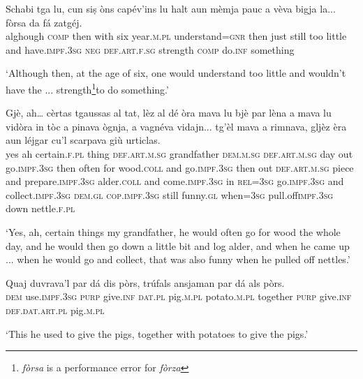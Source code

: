 \begin{linenumbers}
\gll Schabi tga lu, cun siṣ òns capév’ins lu halt aun mèmja pauc a vèva bigja la... fòrsa da fá zatgéj.   \\
alghough \textsc{comp} then with six year.\textsc{m.pl} understand=\textsc{gnr} then just still too  little and have.\textsc{impf.3sg}  \textsc{neg} \textsc{def.art.f.sg} strength \textsc{comp} do.\textsc{inf} something  \\
\end{linenumbers}
\medskip
\glt `Although then, at the age of six, one would understand too little and wouldn’t have the ... strength\footnote{\textit{fòrsa} is a performance error for \textit{fòrza}}to do something.'
\medskip

\begin{linenumbers}
\gll  Gjè, ah… cèrtas tgaussas al tat, lèz al dé òra mava lu bjè par lèna a mava lu vidòra in tòc a pinava ògnja, a vagnéva vidajn... tg’èl mava a rimnava, gljèz èra aun léjgar cu’l scarpava giù urticlas.  \\
yes ah certain.\textsc{f.pl} thing \textsc{def.art.m.sg} grandfather \textsc{dem.m.sg}  \textsc{def.art.m.sg} day out go.\textsc{impf.3sg} then often for wood.\textsc{coll} and go.\textsc{impf.3sg} then out \textsc{def.art.m.sg} piece and prepare.\textsc{impf.3sg} alder.\textsc{coll} and come.\textsc{impf.3sg} in \textsc{rel=3sg} go.\textsc{impf.3sg} and collect.\textsc{impf.3sg} \textsc{dem.gl} \textsc{cop.impf.3sg} still funny.\textsc{gl} when=\textsc{3sg}  pull.off\textsc{impf.3sg} down nettle.\textsc{f.pl} \\
\end{linenumbers}
\medskip
\glt `Yes, ah, certain things my grandfather, he would often go for wood the whole day, and he would then go down a little bit and log alder, and when he came up ... when he would go and collect, that was also funny when he pulled off nettles.'\medskip

\begin{linenumbers}
\gll   Quaj duvrava’l par dá dis pòrs, trúfals ansjaman par dá als pòrs. \\
 \textsc{dem} use.\textsc{impf.3sg} \textsc{purp} give.\textsc{inf}  \textsc{dat.pl} pig.\textsc{m.pl} potato.\textsc{m.pl} together  \textsc{purp}  give.\textsc{inf} \textsc{def.dat.art.pl} pig.\textsc{m.pl} \\
\end{linenumbers}
\medskip
\glt `This he used to give the pigs, together with potatoes to give the pigs.'
\medskip

